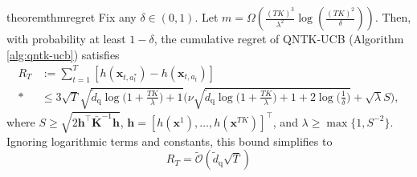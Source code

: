 \documentclass[pdflatex,sn-mathphys-num]{sn-jnl}%
\theoremstyle{thmstyleone}%
\theoremstyle{thmstyletwo}%
\theoremstyle{thmstylethree}%
\newcommand{\bigOmega}{\Omega}
\newcommand{\xbf}{\mathbf{x}}
\newcommand{\Kbf}{\mathbf{K}}
\newcommand{\hbf}{\mathbf{h}}
\begin{document}
\begin{restatable}{theorem}{thmregret} \label{thm:regret}
Fix any $\delta\in(0,1)$. Let $m = \bigOmega\left( \frac{(TK)^3}{\lambda^2}\log\left(\frac{(TK)^2}{\delta}\right) \right)$. Then, 
with probability at least $1-\delta$, the cumulative regret of QNTK-UCB  (Algorithm \ref{alg:qntk-ucb}) satisfies
\begin{align*}
R_T&    := \sum_{t=1}^T \left[ h(\xbf_{t, a_t^*}) - h(\xbf_{t, a_t}) \right] \\*
&\le
3\sqrt{T}\sqrt{\widetilde{d}_{\mathrm{q}}\log \Big(1+\frac{TK}{\lambda}\Big)+1}\Big(\nu\sqrt{\widetilde{d}_{\mathrm{q}}\log\!\Big(1+\frac{TK}{\lambda}\Big)+ 1 +2\log\big(\frac{1}{\delta}\big)}+\sqrt{\lambda}S\Big),
\end{align*}
where $S \geq  \sqrt{2\hbf^\top \bar{\Kbf}^{-1} \hbf}$, $\hbf = [h(\xbf^1), \dots, h(\xbf^{TK})]^\top$,  and $\lambda \geq \max\{1,S^{-2}\}$. %
Ignoring logarithmic terms and constants,   this bound simplifies to $$ 
R_T = \tilde{\mathcal{O}}\left(\widetilde{d}_{\mathrm{q}} \sqrt{T} \right)
$$
\end{restatable}

\end{document}
